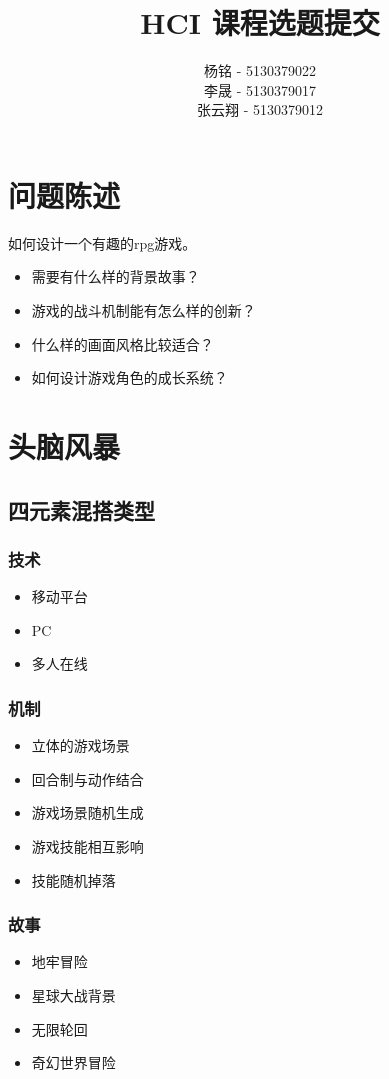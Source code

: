 ﻿\documentclass{article}
\author{杨铭 - 5130379022\\
	李晟 - 5130379017\\
	张云翔 - 5130379012}
\title{HCI 课程选题提交}
\begin{document}
\maketitle
\section{问题陈述}
如何设计一个有趣的rpg游戏。
\begin{itemize}
	\item 需要有什么样的背景故事？
	\item 游戏的战斗机制能有怎么样的创新？
	\item 什么样的画面风格比较适合？
	\item 如何设计游戏角色的成长系统？
\end{itemize}
\section{头脑风暴}
\subsection{四元素混搭类型}
\subsubsection{技术}
\begin{itemize}
	\item 移动平台
	\item PC
	\item 多人在线
\end{itemize}
\subsubsection{机制}
\begin{itemize}
	\item 立体的游戏场景
	\item 回合制与动作结合
	\item 游戏场景随机生成
	\item 游戏技能相互影响
	\item 技能随机掉落
\end{itemize}
\subsubsection{故事}
\begin{itemize}
	\item 地牢冒险
	\item 星球大战背景
	\item 无限轮回
	\item 奇幻世界冒险
\end{itemize}
\end{document}

